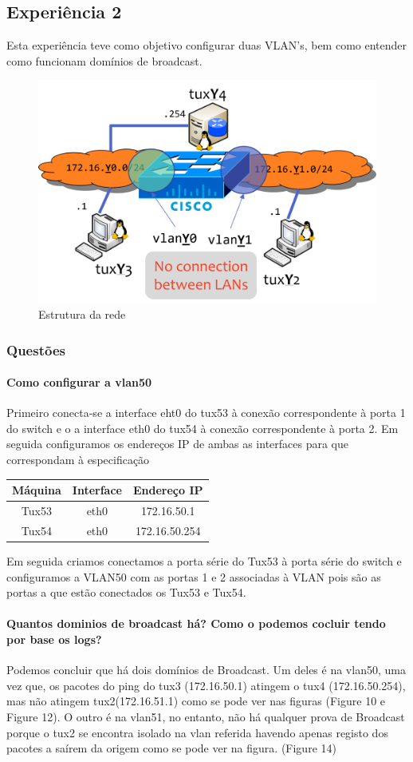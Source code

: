 \subsection{Experiência 2}

Esta experiência teve como objetivo configurar duas VLAN's, bem como entender como funcionam domínios de broadcast.

\begin{figure}[!h]
\centering
  \includegraphics[width=.4\linewidth]{img/net-vlans.png}
  \caption{Estrutura da rede}
\end{figure}

\subsubsection{Questões}
\paragraph{Como configurar a vlan50}
Primeiro conecta-se a interface eht0 do tux53 à conexão correspondente à porta 1 do switch e o a interface eth0 do tux54 à conexão correspondente à porta 2. Em seguida configuramos os endereços IP de ambas as interfaces para que correspondam à especificação


\begin{center}
\begin{tabular}{ c c c }
    \textbf{Máquina} & \textbf{Interface} & \textbf{Endereço IP} \\ \hline 
    Tux53 & eth0 & 172.16.50.1 \\  
    Tux54 & eth0 & 172.16.50.254    
\end{tabular}
\end{center}


Em seguida criamos conectamos a porta série do Tux53 à porta série do switch e configuramos a VLAN50 com as portas 1 e 2 associadas à VLAN pois são as portas a que estão conectados os Tux53 e Tux54.

\paragraph{Quantos dominios de broadcast há? Como o podemos cocluir tendo por base os logs?}

Podemos concluir que há dois domínios de Broadcast. Um deles é na vlan50, uma vez que, os pacotes do ping do tux3 (172.16.50.1) atingem o tux4 (172.16.50.254), mas não atingem tux2(172.16.51.1) como se pode ver nas figuras (Figure 10 e Figure 12). O outro é na vlan51, no entanto, não há qualquer prova de Broadcast porque o tux2 se encontra isolado na vlan referida havendo apenas registo dos pacotes a saírem da origem como se pode ver na figura. (Figure 14)